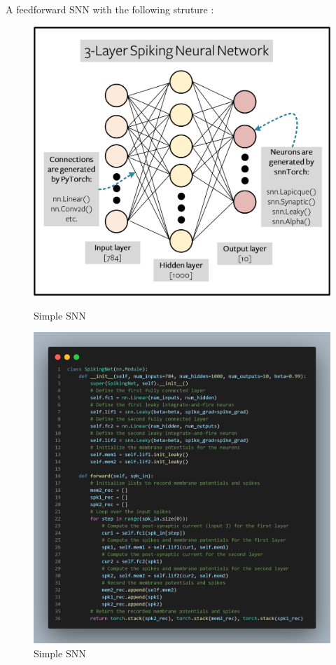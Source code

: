 \documentclass[11pt]{article}
\begin{document}
A feedforward SNN with the following struture :
\begin{figure}[H]
  \begin{minipage}{0.4\textwidth}
    \centering
    \includegraphics[width=0.9\linewidth]{image/2_8_fcn.png}
    \caption{Simple SNN}
    \label{fig:simple_snn}
  \end{minipage}
  \begin{minipage}{0.5\textwidth}
    \centering
    \includegraphics[width=\linewidth]{image/2_8_fcn_code.png}
    \caption{Simple SNN}
    \label{fig:simple_snn_code}
  \end{minipage}
\end{figure}
\end{document}
